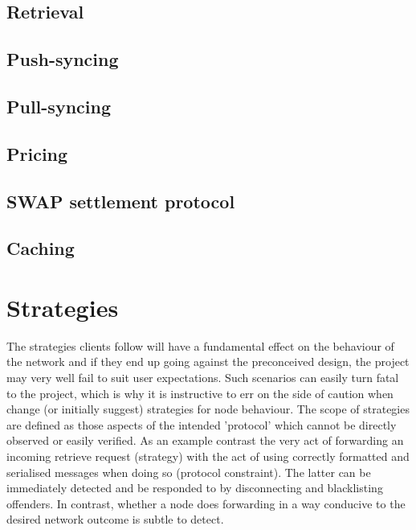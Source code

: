 \section{Retrieval  \statusorange}\label{spec:protocol:retrieval}


\section{Push-syncing  \statusorange}\label{spec:protocol:push-sync}


\section{Pull-syncing \statusorange}\label{spec:protocol:pull-sync}


\section{Pricing} \statusorange\label{spec:protocol:pricing}


\section{SWAP settlement protocol \statusorange}\label{spec:protocol:swap}


\section{Caching \statusorange}\label{spec.protocol:caching}


\chapter{Strategies \statusorange}\label{spec:strategy}


The strategies clients follow will have a fundamental effect on the behaviour of the network and if they end up going against the preconceived design, the project may very well fail to suit user expectations. Such scenarios can easily turn fatal to the project, which is why it is instructive to err on the side of caution when change (or initially suggest) strategies for node behaviour.
The scope of strategies are defined as those aspects of the intended 'protocol' which cannot be directly observed or easily verified. As an example contrast the very act of forwarding an incoming retrieve request (strategy) with the act of using correctly formatted and serialised messages when doing so (protocol constraint). The latter can be immediately detected and be responded to by disconnecting and blacklisting offenders. In contrast, whether a node does forwarding in a way conducive to the desired network outcome is subtle to detect. 


